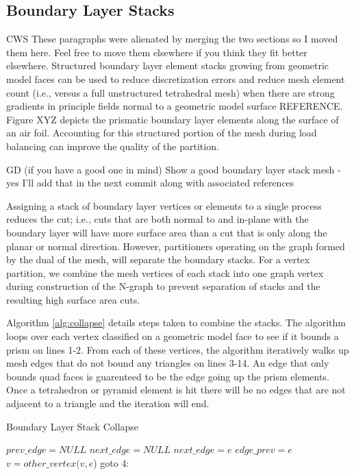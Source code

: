 \documentclass[conference]{IEEEtran}
\begin{document}
\subsection{Boundary Layer Stacks}

{\color{red} CWS These paragraphs were alienated by merging the two sections so I moved them here. Feel free to move them elsewhere if you think they fit better elsewhere.}
Structured boundary layer element stacks growing from geometric model faces can
be used to reduce discretization errors and reduce mesh element count (i.e., versus
a full unstructured tetrahedral mesh) when there are strong gradients in
principle fields normal to a geometric model surface {\color{red} REFERENCE}.
Figure XYZ depicts the prismatic boundary layer elements along the surface of an
air foil.
Accounting for this structured portion of the mesh during load balancing can
improve the quality of the partition.

{\color{red} GD (if you have a good one in mind) Show a good boundary layer
stack mesh - yes I'll add that in the next commit along with associated
references}

Assigning a stack of boundary layer vertices or
elements to a single process reduces the cut; i.e., cuts that are both normal to
and in-plane with the boundary layer will have more surface area than a cut that
is only along the planar or normal direction.
However, partitioners
operating on the graph formed by the dual of the mesh, will separate
the boundary stacks. For a vertex partition, we combine the mesh vertices of each stack into one graph vertex
during construction of the N-graph to prevent separation of stacks and the
resulting high surface area cuts. 

Algorithm \ref{alg:collapse} details steps taken to
combine the stacks. The algorithm loops over each vertex classified on a geometric
model face to see if it bounds a prism on lines 1-2. From each of these vertices, the
algorithm iteratively walks up mesh edges that do not bound any triangles on lines 3-14. An edge
that only bounds quad faces is guarenteed to be the edge going up the prism elements. Once
a tetrahedron or pyramid element is hit there will be no edges that are not adjacent to a triangle
and the iteration will end.
\begin{algorithm}
  \caption{Boundary Layer Stack Collapse}
  \label{alg:collapse}
  \small
  \begin{algorithmic}[1]
    \State $prev\_edge = NULL$
    \State $next\_edge = NULL$
    \State $next\_edge = e$
    \EndIf
    \EndFor
    \State $edge\_prev = e$
    \State $v = other\_vertex(v,e$)
    \State goto 4:
    \EndIf
    \EndIf
    \EndFor
  \end{algorithmic}
\end{algorithm}
\end{document}
